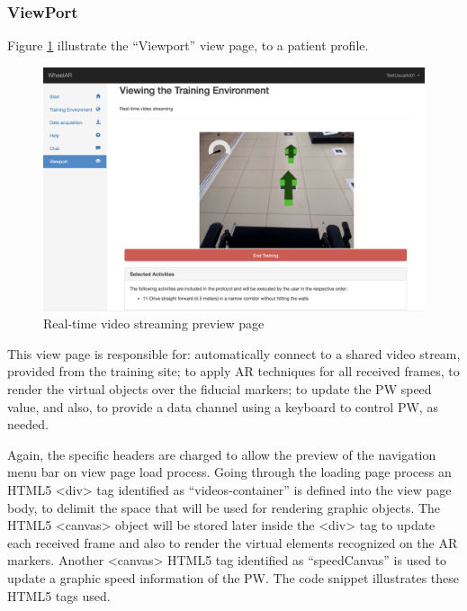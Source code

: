 \subsubsection{ViewPort}
\label{sec:viewPortUser} 

Figure \ref{fig:tViewPortUser} illustrate the ``Viewport'' view page, to a patient profile. 

\begin{figure}[!hbt]
\begin{center}
\includegraphics[width=1\linewidth]{img/cap5/tViewPortUser}
\caption{Real-time video streaming preview page} \label{fig:tViewPortUser}
\end{center}
\vspace{-15pt}
\end{figure}

This view page is responsible for:  automatically connect to a shared video stream, provided from the training site; to apply  AR techniques for all received frames, to render the virtual objects over the fiducial markers; to update the PW speed value, and also, to provide a data channel using a keyboard to control PW, as needed.

Again, the specific headers are charged to allow the preview of the navigation menu bar on view page load process. Going through the loading page process an HTML5 <div> tag identified as ``videos-container'' is defined into the view page body, to delimit the space that will be used for rendering graphic objects. The HTML5  <canvas> object will be stored later inside the <div> tag to update each received frame and also to render the virtual elements recognized on the AR markers. Another <canvas> HTML5 tag identified as ``speedCanvas'' is used to update a graphic speed information of the PW. The code snippet illustrates these HTML5 tags used. \newline

